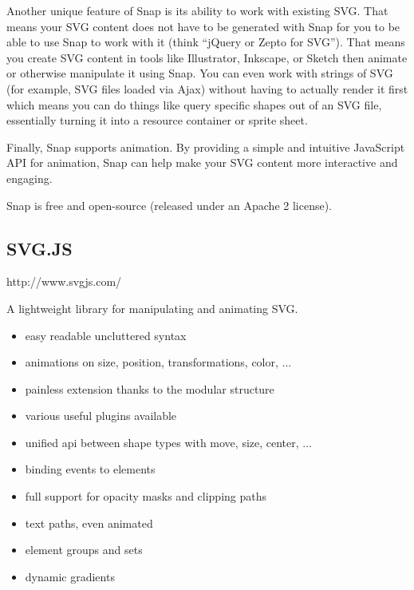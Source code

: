 Another unique feature of Snap is its ability to work with existing SVG. That means your SVG content does not have to be generated with Snap for you to be able to use Snap to work with it (think “jQuery or Zepto for SVG”). That means you create SVG content in tools like Illustrator, Inkscape, or Sketch then animate or otherwise manipulate it using Snap. You can even work with strings of SVG (for example, SVG files loaded via Ajax) without having to actually render it first which means you can do things like query specific shapes out of an SVG file, essentially turning it into a resource container or sprite sheet.

Finally, Snap supports animation. By providing a simple and intuitive JavaScript API for animation, Snap can help make your SVG content more interactive and engaging.

Snap is    free and   open-source (released under an Apache 2 license).

\subsection{SVG.JS}
http://www.svgjs.com/

A lightweight library for manipulating and animating SVG. 

\begin{itemize}
	\item easy readable uncluttered syntax
	\item    animations on size, position, transformations, color, ...
	\item   painless extension thanks to the modular structure
	\item various useful plugins available
	\item unified api between shape types with move, size, center, ...
	\item binding events to elements
	\item full support for opacity masks and clipping paths
	\item text paths, even animated
	\item   element groups and sets
	\item   dynamic gradients
\end{itemize}